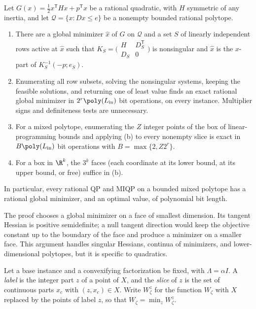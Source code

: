 \begin{lemma}\label{lem:qp:face}
Let $G(x)=\frac12x^{\mathsf T} Hx+p^{\mathsf T} x$ be a rational quadratic, with $H$
symmetric of any inertia, and let $\mathcal Q=\{x:Dx\le e\}$ be a nonempty
bounded rational polytope.
\begin{enumerate}[label=(\alph*)]
\item There are a global minimizer $\hat x$ of $G$ on $\mathcal Q$ and a set
 $S$ of linearly independent rows active at $\hat x$ such that
 $K_S=\bigl(\begin{smallmatrix}H&D_S^{\mathsf T}\\D_S&0\end{smallmatrix}\bigr)$ is
 nonsingular and $\hat x$ is the $x$-part of $K_S^{-1}(-p;e_S)$.
\item Enumerating all row subsets, solving the nonsingular systems, keeping
 the feasible solutions, and returning one of least value finds an exact
 rational global minimizer in $2^r\poly(L_{\rm in})$ bit operations, on every
 instance. Multiplier signs and definiteness tests are unnecessary.
\item For a mixed polytope, enumerating the $Z$ integer points of the box of
 linear-programming bounds and applying (b) to every nonempty slice is exact
 in $B\poly(L_{\rm in})$ bit operations with $B=\max\{2,Z2^r\}$.
\item For a box in $\R^k$, the $3^k$ faces (each coordinate at its lower
 bound, at its upper bound, or free) suffice in (b).
\end{enumerate}
In particular, every rational QP and MIQP on a bounded mixed polytope has a
rational global minimizer, and an optimal value, of polynomial bit length.
\end{lemma}

The proof chooses a global minimizer on a face of smallest dimension. Its
tangent Hessian is positive semidefinite; a null tangent direction would keep
the objective constant up to the boundary of the face and produce a minimizer
on a smaller face. This argument handles singular Hessians, continua of
minimizers, and lower-dimensional polytopes, but it is specific to quadratics.

Let a base instance and a convexifying factorization be fixed, with
$\Lambda=\alpha I$. A \emph{label} is the integer part $z$ of a point of $X$,
and the \emph{slice} of $z$ is the set of continuous parts $x_c$ with
$(z,x_c)\in X$. Write $W_\zeta^z$ for the function $W_\zeta$ with $X$
replaced by the points of label $z$, so that $W_\zeta=\min_zW_\zeta^z$.

